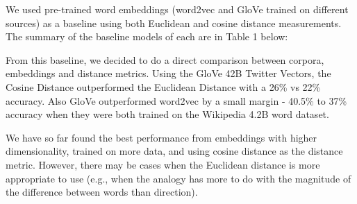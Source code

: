 \documentclass[11pt]{article}
\begin{document}
We used pre-trained word embeddings (word2vec and GloVe trained on
different sources) as a baseline using both Euclidean and cosine
distance measurements. The summary of the baseline models of each are in
Table 1 below:





From this baseline, we decided to do a direct comparison between
corpora, embeddings and distance metrics. Using the GloVe 42B Twitter
Vectors, the Cosine Distance outperformed the Euclidean Distance with a
26\% vs 22\% accuracy. Also GloVe outperformed word2vec by a small
margin - 40.5\% to 37\% accuracy when they were both trained on the
Wikipedia 4.2B word dataset.

We have so far found the best performance from embeddings with higher
dimensionality, trained on more data, and using cosine distance as the
distance metric. However, there may be cases when the Euclidean distance
is more appropriate to use (e.g., when the analogy has more to do with
the magnitude of the difference between words than direction).
\end{document}
